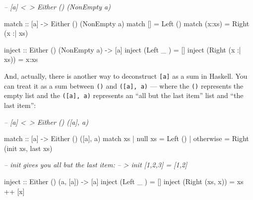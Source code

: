 \documentclass[]{article}
\newenvironment{Shaded}{}{}
\newcommand{\CommentTok}[1]{\textcolor[rgb]{0.38,0.63,0.69}{\textit{#1}}}
\newcommand{\DataTypeTok}[1]{\textcolor[rgb]{0.56,0.13,0.00}{#1}}
\newcommand{\FunctionTok}[1]{\textcolor[rgb]{0.02,0.16,0.49}{#1}}
\newcommand{\NormalTok}[1]{#1}
\newcommand{\OtherTok}[1]{\textcolor[rgb]{0.00,0.44,0.13}{#1}}
\begin{document}
\begin{Shaded}
\begin{Highlighting}[]
\CommentTok{-- [a] <~> Either () (NonEmpty a)}

\OtherTok{match ::}\NormalTok{ [a] }\OtherTok{->} \DataTypeTok{Either}\NormalTok{ () (}\DataTypeTok{NonEmpty}\NormalTok{ a)}
\NormalTok{match []     }\FunctionTok{=} \DataTypeTok{Left}\NormalTok{  ()}
\NormalTok{match (x}\FunctionTok{:}\NormalTok{xs) }\FunctionTok{=} \DataTypeTok{Right}\NormalTok{ (x }\FunctionTok{:|}\NormalTok{ xs)}

\OtherTok{inject ::} \DataTypeTok{Either}\NormalTok{ () (}\DataTypeTok{NonEmpty}\NormalTok{ a) }\OtherTok{->}\NormalTok{ [a]}
\NormalTok{inject (}\DataTypeTok{Left}\NormalTok{   _       ) }\FunctionTok{=}\NormalTok{ []}
\NormalTok{inject (}\DataTypeTok{Right}\NormalTok{ (x }\FunctionTok{:|}\NormalTok{ xs)) }\FunctionTok{=}\NormalTok{ x}\FunctionTok{:}\NormalTok{xs}
\end{Highlighting}
\end{Shaded}

And, actually, there is another way to deconstruct \texttt{{[}a{]}} as a sum in
Haskell. You can treat it as a sum between \texttt{()} and
\texttt{({[}a{]},\ a)} --- where the \texttt{()} represents the empty list and
the \texttt{({[}a{]},\ a)} represents an ``all but the last item'' list and
``the last item'':

\begin{Shaded}
\begin{Highlighting}[]
\CommentTok{-- [a] <~> Either () ([a], a)}

\OtherTok{match  ::}\NormalTok{ [a] }\OtherTok{->} \DataTypeTok{Either}\NormalTok{ () ([a], a)}
\NormalTok{match xs}
  \FunctionTok{|}\NormalTok{ null xs   }\FunctionTok{=} \DataTypeTok{Left}\NormalTok{  ()}
  \FunctionTok{|}\NormalTok{ otherwise }\FunctionTok{=} \DataTypeTok{Right}\NormalTok{ (init xs, last xs)}

\CommentTok{-- init gives you all but the last item:}
\CommentTok{-- > init [1,2,3] = [1,2]}

\OtherTok{inject ::} \DataTypeTok{Either}\NormalTok{ () (a, [a]) }\OtherTok{->}\NormalTok{ [a]}
\NormalTok{inject (}\DataTypeTok{Left}\NormalTok{   _     ) }\FunctionTok{=}\NormalTok{ []}
\NormalTok{inject (}\DataTypeTok{Right}\NormalTok{ (xs, x)) }\FunctionTok{=}\NormalTok{ xs }\FunctionTok{++}\NormalTok{ [x]}
\end{Highlighting}
\end{Shaded}
\end{document}
